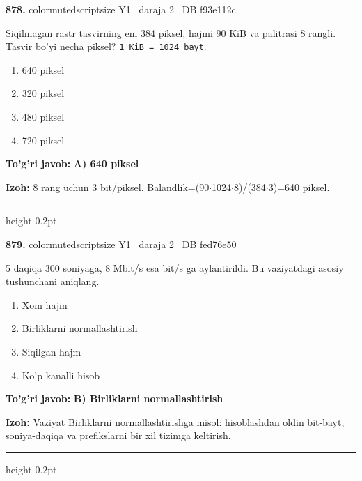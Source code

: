 \documentclass[10pt,a4paper,oneside]{article}
\begin{document}
\noindent\textbf{\color{ink}878.}  {color{muted}scriptsize Y1 \textbullet\ daraja 2 \textbullet\ DB f93e112c}
\par
Siqilmagan rastr tasvirning eni 384 piksel, hajmi 90 KiB va palitrasi 8 rangli. Tasvir bo'yi necha piksel? \texttt{1 KiB = 1024 bayt}.
\begin{enumerate}[label=\Alph*),leftmargin=9mm]
\item 640 piksel
\item 320 piksel
\item 480 piksel
\item 720 piksel
\end{enumerate}
\begin{tcolorbox}[enhanced,breakable,colback=teal!4,colframe=teal!50!black,boxrule=0.5pt,arc=1.1mm,left=3mm,right=3mm,top=1.7mm,bottom=1.7mm,before skip=2mm,after skip=2mm]
\textbf{\color{teal}To'g'ri javob:} \textbf{A) 640 piksel}
\par\smallskip
\textbf{Izoh:} 8 rang uchun 3 bit/piksel. Balandlik=(90\ensuremath{\cdot}1024\ensuremath{\cdot}8)/(384\ensuremath{\cdot}3)=640 piksel.
\end{tcolorbox}
\vspace{2mm}\hrule height 0.2pt \vspace{3mm}

\noindent\textbf{\color{ink}879.}  {color{muted}scriptsize Y1 \textbullet\ daraja 2 \textbullet\ DB fed76e50}
\par
5 daqiqa 300 soniyaga, 8 Mbit/s esa bit/s ga aylantirildi. Bu vaziyatdagi asosiy tushunchani aniqlang.
\begin{enumerate}[label=\Alph*),leftmargin=9mm]
\item Xom hajm
\item Birliklarni normallashtirish
\item Siqilgan hajm
\item Ko'p kanalli hisob
\end{enumerate}
\begin{tcolorbox}[enhanced,breakable,colback=teal!4,colframe=teal!50!black,boxrule=0.5pt,arc=1.1mm,left=3mm,right=3mm,top=1.7mm,bottom=1.7mm,before skip=2mm,after skip=2mm]
\textbf{\color{teal}To'g'ri javob:} \textbf{B) Birliklarni normallashtirish}
\par\smallskip
\textbf{Izoh:} Vaziyat Birliklarni normallashtirishga misol: hisoblashdan oldin bit-bayt, soniya-daqiqa va prefikslarni bir xil tizimga keltirish.
\end{tcolorbox}
\vspace{2mm}\hrule height 0.2pt \vspace{3mm}
\end{document}
